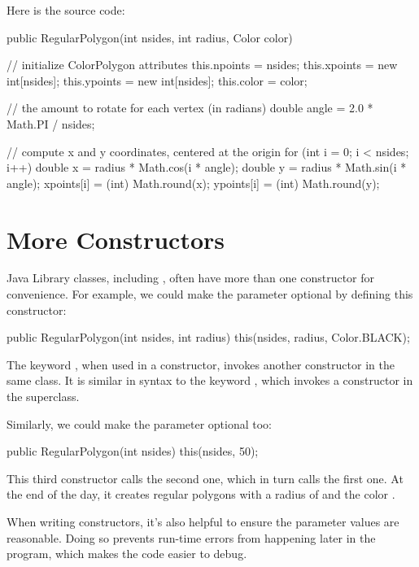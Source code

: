 Here is the source code:

\begin{code}
public RegularPolygon(int nsides, int radius, Color color) {

    // initialize ColorPolygon attributes
    this.npoints = nsides;
    this.xpoints = new int[nsides];
    this.ypoints = new int[nsides];
    this.color = color;

    // the amount to rotate for each vertex (in radians)
    double angle = 2.0 * Math.PI / nsides;

    // compute x and y coordinates, centered at the origin
    for (int i = 0; i < nsides; i++) {
        double x = radius * Math.cos(i * angle);
        double y = radius * Math.sin(i * angle);
        xpoints[i] = (int) Math.round(x);
        ypoints[i] = (int) Math.round(y);
    }
}
\end{code}



\section{More Constructors}

Java Library classes, including , often have more than one constructor for convenience.
For example, we could make the  parameter optional by defining this constructor:

\begin{code}
public RegularPolygon(int nsides, int radius) {
    this(nsides, radius, Color.BLACK);
}
\end{code}

The keyword , when used in a constructor, invokes another constructor in the same class.
It is similar in syntax to the keyword , which invokes a constructor in the superclass.

Similarly, we could make the  parameter optional too:

\begin{code}
public RegularPolygon(int nsides) {
    this(nsides, 50);
}
\end{code}

This third constructor calls the second one, which in turn calls the first one.
At the end of the day, it creates regular polygons with a radius of  and the color .

When writing constructors, it's also helpful to ensure the parameter values are reasonable.
Doing so prevents run-time errors from happening later in the program, which makes the code easier to debug.

